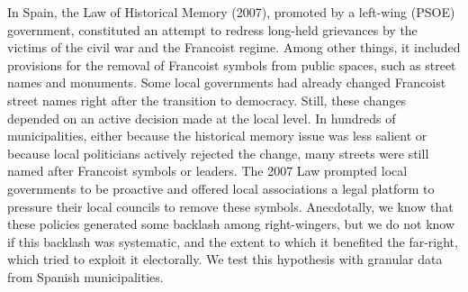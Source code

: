 \documentclass[12pt, notitlepage]{article}
\begin{document}
In Spain, the Law of Historical Memory (2007), promoted by a left-wing (PSOE) government, constituted an attempt to redress long-held grievances by the victims of the civil war and the Francoist regime. Among other things, it included provisions for the removal of Francoist symbols from public spaces, such as street names and monuments. Some local governments had already changed Francoist street names right after the transition to democracy. Still, these changes depended on an active decision made at the local level. In hundreds of municipalities, either because the historical memory issue was less salient or because local politicians actively rejected the change, many streets were still named after Francoist symbols or leaders.
The 2007 Law prompted local governments to be proactive and offered local associations a legal platform to pressure their local councils to remove these symbols. Anecdotally, we know that these policies generated some backlash among right-wingers, but we do not know if this backlash was systematic, and the extent to which it benefited the far-right, which tried to exploit it electorally. We test this hypothesis with granular data from Spanish municipalities.



\end{document}
